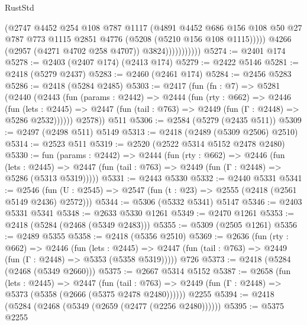 \begin{lexlean}{RustStd}
\begin{coremodule}
                            (@2747
                              @4452
                              @254
                              @108
                              @787
                              @1117
                              (@4891
                                @4452
                                @686
                                @156
                                @108
                                @50
                                @27
                                @787
                                @773
                                @1115
                                @2851
                                @4776
                                (@5208 (@5210 @156 @108 @1115)))))
                          @4266
                          (@2957 (@4271 @4702 @258 @4707))
                          @3824)))))))))))
@5274 := @2401 @174
@5278 := @2403 (@2407 @174) (@2413 @174)
@5279 := @2422 @5146
@5281 := @2418 (@5279 @2437)
@5283 := @2460 (@2461 @174)
@5284 := @2456 @5283
@5286 := @2418 (@5284 @2485)
@5303 := @2417
    (fun (fn : @7) =>
    @5281
      (@2440
        (@2443
          (fun (params : @2442) =>
          @2444
            (fun (rty : @662) =>
            @2446
              (fun (lets : @2445) =>
              @2447 (fun (tail : @763) => @2449 (fun (Γ : @2448) => @5286 @2532))))))
        @2578))
    @511
@5306 := @2584 (@5279 (@2435 @511))
@5309 := @2497 (@2498 @511) @5149
@5313 := @2418 (@2489 (@5309 @2506) @2510)
@5314 := @2523 @511
@5319 := @2520 (@2522 @5314 @5152 @2478 @2480)
@5330 := fun (params : @2442) =>
  @2444
    (fun (rty : @662) =>
    @2446
      (fun (lets : @2445) =>
      @2447 (fun (tail : @763) => @2449 (fun (Γ : @2448) => @5286 (@5313 @5319)))))
@5331 := @2443 @5330
@5332 := @2440 @5331
@5341 := @2546 (fun (U : @2545) => @2547 (fun (t : @23) => @2555 (@2418 (@2561 @5149 @2436) @2572)))
@5344 := @5306 (@5332 @5341) @5147
@5346 := @2403 @5331 @5341
@5348 := @2633 @5330 @1261
@5349 := @2470 @1261
@5353 := @2418 (@5284 (@2468 (@5349 @2483)))
@5355 := @5309 (@2505 @1261)
@5356 := @2489 @5355
@5358 := @2418 (@5356 @2510)
@5369 := @2636
    (fun (rty : @662) =>
    @2446
      (fun (lets : @2445) =>
      @2447 (fun (tail : @763) => @2449 (fun (Γ : @2448) => @5353 (@5358 @5319)))))
    @726
@5373 := @2418 (@5284 (@2468 (@5349 @2660)))
@5375 := @2667 @5314 @5152
@5387 := @2658
    (fun (lets : @2445) =>
    @2447
      (fun (tail : @763) => @2449 (fun (Γ : @2448) => @5373 (@5358 (@2666 (@5375 @2478 @2480))))))
    @2255
@5394 := @2418 (@5284 (@2468 (@5349 (@2659 (@2477 (@2256 @2480))))))
@5395 := @5375 @2255

\end{coremodule}
\end{lexlean}
